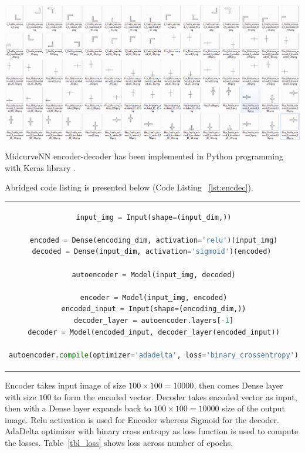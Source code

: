 \documentclass[9pt,academicons]{article}
\begin{document}
     \begin{center}
	\includegraphics[width=\linewidth]{images/training_data}
	\label{fig_training}
    \end{center}
    
MidcurveNN encoder-decoder has been implemented in Python programming with Keras library \cite{autoenkeras}.  

Abridged code listing is presented below (Code Listing ~\ref{lst:encdec}).

\begin{center}
\begin{tabular}{c}
\begin{lstlisting}[language=Python, caption=Encoder-Decoder,label={lst:encdec},frame=single]
input_img = Input(shape=(input_dim,))
    
encoded = Dense(encoding_dim, activation='relu')(input_img)
decoded = Dense(input_dim, activation='sigmoid')(encoded) 
    
autoencoder = Model(input_img, decoded)
            
encoder = Model(input_img, encoded)
encoded_input = Input(shape=(encoding_dim,))
decoder_layer = autoencoder.layers[-1]
decoder = Model(encoded_input, decoder_layer(encoded_input))
    
autoencoder.compile(optimizer='adadelta', loss='binary_crossentropy')
\end{lstlisting}	
\end{tabular}
\end{center}

Encoder takes input image of size $100 \times 100 = 10000$, then comes Dense layer with size $100$ to form the encoded vector. Decoder takes encoded vector as input, then with a Dense layer expands back to $100 \times 100 = 10000$ size of the output image. Relu activation is used for Encoder whereas Sigmoid for the decoder. AdaDelta optimizer with binary cross entropy as loss function is used to compute the losses. Table~\ref{tbl_loss} shows loss across number of epochs.    
\end{document}
